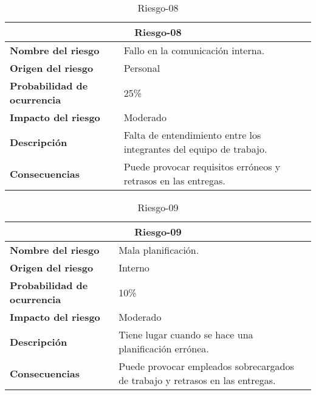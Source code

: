 \begin{table}[H]
\begin{center}
\begin{tabular}{p{} p{7cm}}
\multicolumn{2}{c}{\textbf{Riesgo-08} } \\
\hline \hline
\textbf{Nombre del riesgo} & Fallo en la comunicación interna. \\
\hline
\textbf{Origen del riesgo} & Personal\\
\hline
\textbf{Probabilidad de ocurrencia} &  25\% \\
\hline
\textbf{Impacto del riesgo} &  Moderado \\
\hline
\textbf{Descripción} &  Falta de entendimiento entre los integrantes del equipo de trabajo. \\
\hline
\textbf{Consecuencias} &  Puede provocar requisitos erróneos y retrasos en las entregas. \\
\hline
\end{tabular}
\caption{Riesgo-08}
\label{tab:Riesgo-08}
\end{center}
\end{table}

\begin{table}[H]
\begin{center}
\begin{tabular}{p{} p{7cm}}
\multicolumn{2}{c}{\textbf{Riesgo-09} } \\
\hline \hline
\textbf{Nombre del riesgo} & Mala planificación. \\
\hline
\textbf{Origen del riesgo} & Interno\\
\hline
\textbf{Probabilidad de ocurrencia} &  10\% \\
\hline
\textbf{Impacto del riesgo} &  Moderado \\
\hline
\textbf{Descripción} &  Tiene lugar cuando se hace una planificación errónea. \\
\hline
\textbf{Consecuencias} & Puede provocar empleados sobrecargados de trabajo y retrasos en las entregas.  \\
\hline
\end{tabular}
\caption{Riesgo-09}
\label{tab:Riesgo-09}
\end{center}
\end{table}

